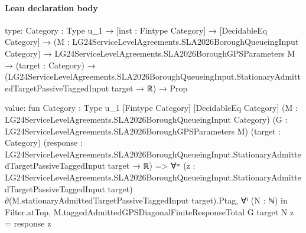 \documentclass[10pt]{article}
\begin{document}
\paragraph{Lean declaration body}
\begin{ReviewVerbatim}
type:
{Category : Type u_1} →
  [inst : Fintype Category] →
    [DecidableEq Category] →
      (M : LG24ServiceLevelAgreements.SLA2026BoroughQueueingInput Category) →
        LG24ServiceLevelAgreements.SLA2026BoroughGPSParameters M →
          (target : Category) →
            (LG24ServiceLevelAgreements.SLA2026BoroughQueueingInput.StationaryAdmittedTargetPassiveTaggedInput target →
                ℝ) →
              Prop

value:
fun {Category : Type u_1} [Fintype Category] [DecidableEq Category]
    (M : LG24ServiceLevelAgreements.SLA2026BoroughQueueingInput Category)
    (G : LG24ServiceLevelAgreements.SLA2026BoroughGPSParameters M) (target : Category)
    (response :
      LG24ServiceLevelAgreements.SLA2026BoroughQueueingInput.StationaryAdmittedTargetPassiveTaggedInput target → ℝ) =>
  ∀ᵐ (z :
    LG24ServiceLevelAgreements.SLA2026BoroughQueueingInput.StationaryAdmittedTargetPassiveTaggedInput
      target) ∂(M.stationaryAdmittedTargetPassiveTaggedInput target).Ptag,
    ∀ᶠ (N : ℕ) in Filter.atTop, M.taggedAdmittedGPSDiagonalFiniteResponseTotal G target N z = response z
\end{ReviewVerbatim}
\end{document}
